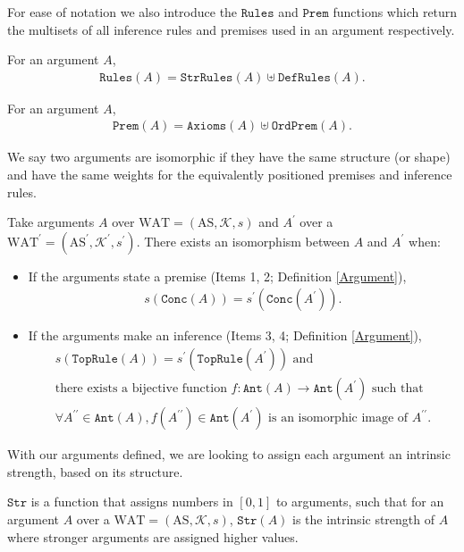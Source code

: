 \documentclass[runningheads]{llncs}
\newcommand{\K}{\mathcal{K}}
\newcommand{\pr}{^\prime}
\newcommand{\Prem}{\texttt{Prem}}
\newcommand{\Ord}{\texttt{OrdPrem}}
\newcommand{\Ax}{\texttt{Axioms}}
\newcommand{\Conc}{\texttt{Conc}}
\newcommand{\Rules}{\texttt{Rules}}
\newcommand{\DefRules}{\texttt{DefRules}}
\newcommand{\StrRules}{\texttt{StrRules}}
\newcommand{\TopRule}{\texttt{TopRule}}
\newcommand{\Ant}{\texttt{Ant}}
\newcommand{\Str}{\texttt{Str}}
\begin{document}
For ease of notation we also introduce the $\Rules$ and $\Prem$ functions which return the multisets of all inference rules and premises used in an argument respectively.

\begin{definition}[$\Rules$]\label{Rules}
For an argument $A$, \begin{gather*}
    \Rules(A) = \StrRules(A) \uplus \DefRules(A).
\end{gather*}
\end{definition}
\begin{definition}[$\Prem$]\label{Prem}
For an argument $A$, \begin{gather*}
    \Prem(A) = \Ax(A) \uplus \Ord(A).
\end{gather*}
\end{definition}

We say two arguments are isomorphic if they have the same structure (or shape) and have the same weights for the equivalently positioned premises and inference rules.
\begin{definition}[Isomorphism] \label{Isomorphism}
Take arguments $A$ over $\text{WAT} = ( \text{AS}, \K, s )$ and $A\pr$ over a $\text{WAT}\pr = ( \text{AS}\pr, \K\pr, s\pr )$. There exists an isomorphism between $A$ and $A\pr$ when:
\begin{itemize}
    \item If the arguments state a premise (Items 1, 2; Definition \ref{Argument}),
    \begin{gather*}
        s(\Conc(A)) = s\pr(\Conc(A\pr)).
    \end{gather*}
    \item If the arguments make an inference (Items 3, 4; Definition \ref{Argument}),
    \begin{multline*}
        s(\TopRule(A)) = s\pr(\TopRule(A\pr))\text{ and} \\\text{there exists a bijective function }f:\Ant(A) \rightarrow \Ant({A\pr}) \text{ such that }\\\forall A^{\prime\prime} \in \Ant(A),f(A^{\prime\prime}) \in \Ant(A\pr) \text{ is an isomorphic image of } A^{\prime\prime}.
    \end{multline*}
\end{itemize}
\end{definition}

With our arguments defined, we are looking to assign each argument an intrinsic strength, based on its structure.

\begin{definition} \label{Strength}
$\Str$ is a function that assigns numbers in $[0,1]$ to arguments, such that for an argument $A$ over a $\text{WAT} = ( \text{AS}, \K, s )$, $\Str(A)$ is the intrinsic strength of $A$ where stronger arguments are assigned higher values.
\end{definition}
%
\end{document}
